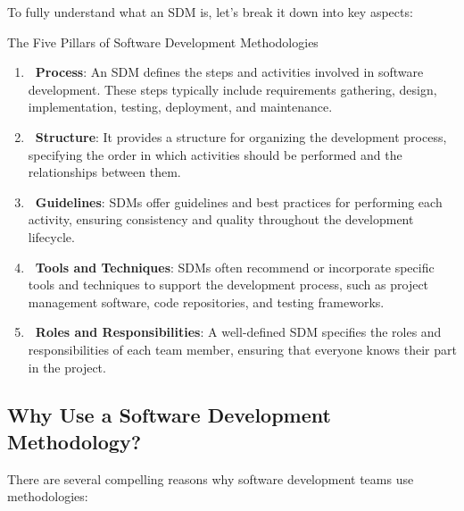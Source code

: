 To fully understand what an SDM is, let's break it down into key aspects:

\begin{conceptcard}{The Five Pillars of Software Development Methodologies}
  \begin{enumerate}
    \item \textbf{\faPlay\ Process}: An SDM defines the steps and activities involved in software development. These steps typically include requirements gathering, design, implementation, testing, deployment, and maintenance.

    \item \textbf{\faSitemap\ Structure}: It provides a structure for organizing the development process, specifying the order in which activities should be performed and the relationships between them.

    \item \textbf{\faBook\ Guidelines}: SDMs offer guidelines and best practices for performing each activity, ensuring consistency and quality throughout the development lifecycle.

    \item \textbf{\faTools\ Tools and Techniques}: SDMs often recommend or incorporate specific tools and techniques to support the development process, such as project management software, code repositories, and testing frameworks.

    \item \textbf{\faUsers\ Roles and Responsibilities}: A well-defined SDM specifies the roles and responsibilities of each team member, ensuring that everyone knows their part in the project.
  \end{enumerate}
\end{conceptcard}


\subsection{Why Use a Software Development Methodology?}

There are several compelling reasons why software development teams use
methodologies:

